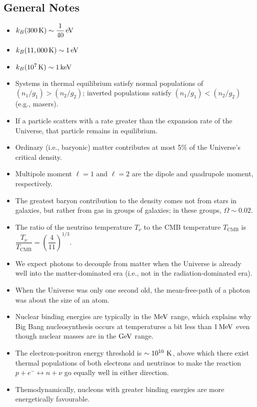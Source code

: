 \documentclass[a4paper,10pt]{article}
\begin{document}
\newpage
\subsection{General Notes}

\begin{itemize}
    \item $k_B(300\,\mathrm{K}) \sim \dfrac{1}{40}\,{\rm eV}$
    \item $k_B(11,000\,\mathrm{K}) \sim 1\,{\rm eV}$
    \item $k_B(10^7\,\mathrm{K}) \sim 1\,{\rm keV}$
    \item Systems in thermal equilibrium satisfy normal populations of $(n_1/g_1)>(n_2/g_2)$; inverted populations satisfy $(n_1/g_1)<(n_2/g_2)$ (e.g., masers).
    \item If a particle scatters with a rate greater than the expansion rate of the Universe, that particle remains in equilibrium.
    \item Ordinary (i.e., baryonic) matter contributes at most 5\% of the Universe's critical density.
    \item Multipole moment $\ell=1$ and $\ell=2$ are the dipole and quadrupole moment, respectively.
    \item The greatest baryon contribution to the density comes not from stars in galaxies, but rather from gas in groups of galaxies; in these groups, $\Omega\sim0.02$.
    \item The ratio of the neutrino temperature $T_\nu$ to the CMB temperature $T_\mathrm{CMB}$ is $\dfrac{T_\nu}{T_\mathrm{CMB}} = \left( \dfrac{4}{11} \right)^{1/3}$.
    \item We expect photons to decouple from matter when the Universe is already well into the matter-dominated era (i.e., not in the radiation-dominated era).
    \item When the Universe was only one second old, the mean-free-path of a photon was about the size of an atom.
    \item Nuclear binding energies are typically in the $\rm{MeV}$ range, which explains why Big Bang nucleosynthesis occurs at temperatures a bit less than $1\,\rm{MeV}$ even though nuclear masses are in the $\rm{GeV}$ range.
    \item The electron-positron energy threshold is $\sim10^{10}~{\rm K}$, above which there exist thermal populations of both electrons and neutrinos to make the reaction $p+e^-\leftrightarrow n+\nu$ go equally well in either direction.
    \item Themodynamically, nucleons with greater binding energies are more energetically favourable.

\end{itemize}
\end{document}
